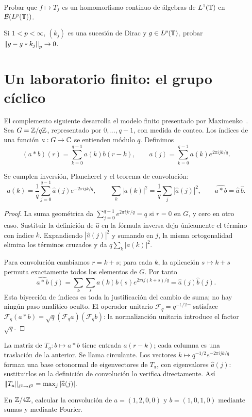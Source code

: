 \begin{ejercicio}\label{ej:v4-l08-3}
Probar que $f\mapsto T_f$ es un homomorfismo continuo de álgebras de $L^1(\mathbb T)$ en $\mathcal B(L^p(\mathbb T))$.
\end{ejercicio}

\begin{ejercicio}\label{ej:v4-l08-4}
Si $1<p<\infty$, $(k_j)$ es una sucesión de Dirac y $g\in L^p(\mathbb T)$, probar $\left\lVert g-g*k_j\right\rVert_p\to0$.
\end{ejercicio}


\section{Un laboratorio finito: el grupo cíclico}
El complemento siguiente desarrolla el modelo finito presentado por Maximenko~\cite{maximenkoConvolucionFinita}. Sea $G=\mathbb Z/q\mathbb Z$, representado por $0,\ldots,q-1$, con medida de conteo. Los índices de una función $a:G\to\mathbb C$ se entienden módulo $q$. Definimos
\[
 (a*b)(r)=\sum_{k=0}^{q-1}a(k)b(r-k),\qquad
 \widehat a(j)=\sum_{k=0}^{q-1}a(k)e^{2\pi ijk/q}.
\]
\begin{teorema}\label{v4:dft}
Se cumplen inversión, Plancherel y el teorema de convolución:
\[
 a(k)=\frac1q\sum_{j=0}^{q-1}\widehat a(j)e^{-2\pi ijk/q},\qquad
 \sum_k|a(k)|^2=\frac1q\sum_j|\widehat a(j)|^2,
 \qquad\widehat{a*b}=\widehat a\,\widehat b.
\]
\end{teorema}
\begin{proof}
La suma geométrica da $\sum_{j=0}^{q-1}e^{2\pi ijr/q}=q$ si $r=0$ en $G$, y cero en otro caso. Sustituir la definición de $\widehat a$ en la fórmula inversa deja únicamente el término con índice $k$. Expandiendo $|\widehat a(j)|^2$ y sumando en $j$, la misma ortogonalidad elimina los términos cruzados y da $q\sum_k|a(k)|^2$.

Para convolución cambiamos $r=k+s$; para cada $k$, la aplicación $s\mapsto k+s$ permuta exactamente todos los elementos de $G$. Por tanto
\[
 \widehat{a*b}(j)=\sum_k\sum_s a(k)b(s)e^{2\pi ij(k+s)/q}
 =\widehat a(j)\widehat b(j).
\]
Esta biyección de índices es toda la justificación del cambio de suma; no hay ningún paso analítico oculto. El operador unitario $\mathcal F_q=q^{-1/2}\widehat{\phantom a}$ satisface $\mathcal F_q(a*b)=\sqrt q(\mathcal F_qa)(\mathcal F_qb)$: la normalización unitaria introduce el factor $\sqrt q$.
\end{proof}
La matriz de $T_a:b\mapsto a*b$ tiene entrada $a(r-k)$; cada columna es una traslación de la anterior. Se llama circulante. Los vectores $k\mapsto q^{-1/2}e^{-2\pi ijk/q}$ forman una base ortonormal de eigenvectores de $T_a$, con eigenvalores $\widehat a(j)$: sustituirlos en la definición de convolución lo verifica directamente. Así $\left\lVert T_a\right\rVert_{\ell^2\to\ell^2}=\max_j|\widehat a(j)|$.
\begin{ejercicio}\label{ej:v4-ampl-dft4}
En $\mathbb Z/4\mathbb Z$, calcular la convolución de $a=(1,2,0,0)$ y $b=(1,0,1,0)$ mediante sumas y mediante Fourier.
\end{ejercicio}



